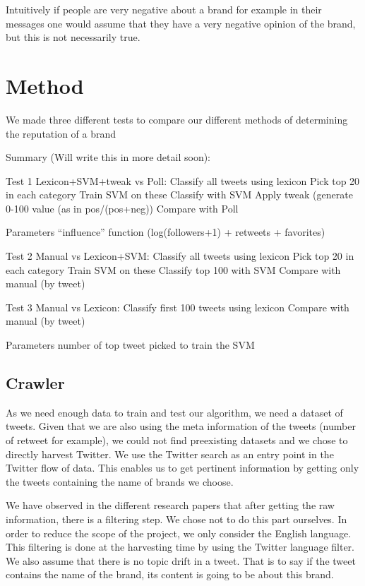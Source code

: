 \documentclass[a4paper,12pt]{report}
\begin{document}
Intuitively if people are very negative about a brand for example in their messages one would assume that they have a very negative opinion of the brand, but this is not necessarily true. 

\chapter{Method}

We made three different tests to compare our different methods of determining the reputation of a brand


Summary (Will write this in more detail soon):

Test 1 Lexicon+SVM+tweak vs Poll:
Classify all tweets using lexicon
Pick top 20 in each category
Train SVM on these
Classify with SVM
Apply tweak (generate 0-100 value (as in pos/(pos+neg))
Compare with Poll

Parameters
“influence” function (log(followers+1) + retweets + favorites)


Test 2 Manual vs Lexicon+SVM:
Classify all tweets using lexicon
Pick top 20 in each category
Train SVM on these
Classify top 100 with SVM
Compare with manual (by tweet)


Test 3 Manual vs Lexicon:
Classify first 100 tweets using lexicon
Compare with manual (by tweet)

Parameters
number of top tweet picked to train the SVM


\section{Crawler}

As we need enough data to train and test our algorithm, we need a dataset of tweets. Given that we are also using the meta information of the tweets (number of retweet for example), we could not find preexisting datasets and we chose to directly harvest Twitter.
We use the Twitter search as an entry point in the Twitter flow of data. This enables us to get pertinent information by getting only the tweets containing the name of brands we choose.

We have observed in the different research papers that after getting the raw information, there is a filtering step. We chose not to do this part ourselves. In order to reduce the scope of the project, we only consider the English language. This filtering is done at the harvesting time by using the Twitter language filter.
We also assume that there is no topic drift in a tweet. That is to say if the tweet contains the name of the brand, its content is going to be about this brand.
\end{document}
